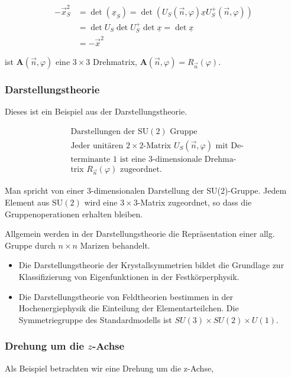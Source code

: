 \documentclass[10pt, letterpaper]{article}
\begin{document}
$$
\begin{aligned}
-\vec{x}_{S}^{2} & =\operatorname{det}\left(\underline{x}_{S}\right)=\operatorname{det}\left(U_{S}(\vec{n}, \varphi) \underline{x} U_{S}^{+}(\vec{n}, \varphi)\right) \\
& =\operatorname{det} U_{S} \operatorname{det} U_{S}^{+} \operatorname{det} \underline{x}=\operatorname{det} \underline{x} \\
& =-\vec{x}^{2}
\end{aligned}
$$

ist $\mathbf{A}(\vec{n}, \varphi)$ eine $3 \times 3$ Drehmatrix, $\mathbf{A}(\vec{n}, \varphi)=R_{\vec{n}}(\varphi)$.

\subsubsection*{Darstellungstheorie}
Dieses ist ein Beispiel aus der Darstellungstheorie.

$$
\begin{aligned}
& \text { Darstellungen der } \mathrm{SU}(2) \text { Gruppe } \\
& \text { Jeder unitären } 2 \times 2 \text {-Matrix } U_{S}(\vec{n}, \varphi) \text { mit De- } \\
& \text { terminante } 1 \text { ist eine } 3 \text {-dimensionale Drehma- } \\
& \text { trix } R_{\vec{n}}(\varphi) \text { zugeordnet. }
\end{aligned}
$$

Man spricht von einer 3-dimensionalen Darstellung der SU(2)-Gruppe. Jedem Element aus $\mathrm{SU}(2)$ wird eine $3 \times 3$-Matrix zugeordnet, so dass die Gruppenoperationen erhalten bleiben.

Allgemein werden in der Darstellungstheorie die Repräsentation einer allg. Gruppe durch $n \times n$ Marizen behandelt.

\begin{itemize}
  \item Die Darstellungstheorie der Krystallsymmetrien bildet die Grundlage zur Klassifizierung von Eigenfunktionen in der Festkörperphysik.
  \item Die Darstellungstheorie von Feldtheorien bestimmen in der Hochenergiephysik die Einteilung der Elementarteilchen. Die Symmetriegruppe des Standardmodells ist $S U(3) \times S U(2) \times U(1)$.
\end{itemize}

\subsubsection*{Drehung um die $z$-Achse}
Als Beispiel betrachten wir eine Drehung um die z-Achse,
\end{document}

